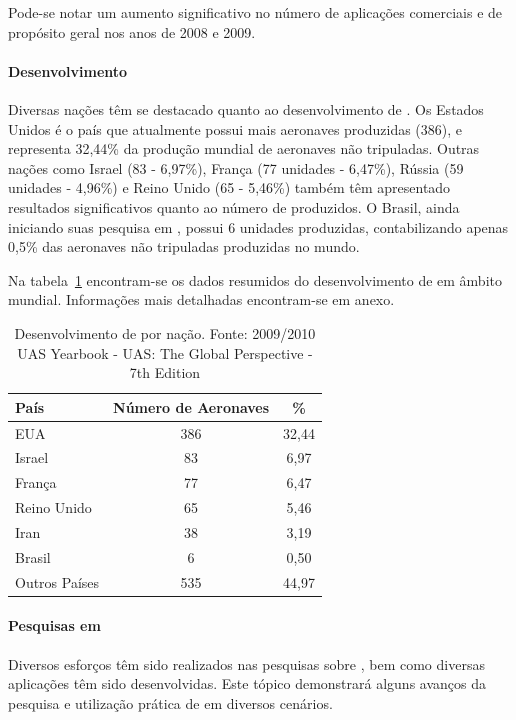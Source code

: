 Pode-se notar um aumento significativo no número de aplicações comerciais e de propósito geral nos anos de 2008 e 2009.

\paragraph{Desenvolvimento}

Diversas nações têm se destacado quanto ao desenvolvimento de \vants. Os Estados Unidos é o país que atualmente possui mais aeronaves produzidas (386), e representa 32,44\% da
produção mundial de aeronaves não tripuladas. Outras nações como Israel (83 - 6,97\%),  França (77 unidades - 6,47\%), Rússia (59 unidades - 4,96\%) e Reino Unido (65 - 5,46\%) também têm apresentado resultados significativos quanto ao número de \vants produzidos. O Brasil, ainda iniciando suas pesquisa em \vants, possui 6 unidades produzidas, contabilizando apenas 0,5\% das aeronaves não tripuladas produzidas no mundo.

Na tabela~\ref{tbl:country} encontram-se os dados resumidos do desenvolvimento de \vants em âmbito mundial. Informações mais detalhadas encontram-se em anexo.

\begin{table}[h!]
\centering
	\begin{tabular}{| l | c | c |}
		\hline
		País & Número de Aeronaves & \% \\
		\hline
		EUA & 386 & 32,44 \\
		Israel & 83 & 6,97 \\
		França & 77 & 6,47 \\
		Reino Unido & 65 & 5,46 \\
		Iran & 38 & 3,19 \\
		Brasil & 6 & 0,50\\
		Outros Países & 535 & 44,97 \\
		\hline
	\end{tabular}

	\caption{Desenvolvimento de \vants por nação. Fonte: 2009/2010 UAS Yearbook - UAS: The Global Perspective - 7th Edition}
	\label{tbl:country}
\end{table}


\paragraph{Pesquisas em \vants}
Diversos esforços têm sido realizados nas pesquisas sobre \uavs, bem como diversas aplicações têm sido desenvolvidas. Este tópico demonstrará alguns avanços da pesquisa e
utilização prática de \vants em diversos cenários.

